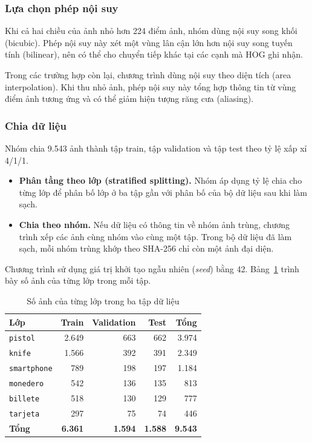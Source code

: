 \subsubsection{Lựa chọn phép nội suy}

Khi cả hai chiều của ảnh nhỏ hơn 224 điểm ảnh, nhóm dùng nội suy song khối (bicubic). Phép nội suy này xét một vùng lân cận lớn hơn nội suy song tuyến tính (bilinear), nên có thể cho chuyển tiếp khác tại các cạnh mà HOG ghi nhận.

Trong các trường hợp còn lại, chương trình dùng nội suy theo diện tích (area interpolation). Khi thu nhỏ ảnh, phép nội suy này tổng hợp thông tin từ vùng điểm ảnh tương ứng và có thể giảm hiện tượng răng cưa (aliasing).

\subsubsection{Chia dữ liệu}

Nhóm chia 9.543 ảnh thành tập train, tập validation và tập test theo tỷ lệ xấp xỉ 4/1/1.

\begin{itemize}
  \item \textbf{Phân tầng theo lớp (stratified splitting).} Nhóm áp dụng tỷ lệ chia cho từng lớp để phân bố lớp ở ba tập gần với phân bố của bộ dữ liệu sau khi làm sạch.
  \item \textbf{Chia theo nhóm.} Nếu dữ liệu có thông tin về nhóm ảnh trùng, chương trình xếp các ảnh cùng nhóm vào cùng một tập. Trong bộ dữ liệu đã làm sạch, mỗi nhóm trùng khớp theo SHA-256 chỉ còn một ảnh đại diện.
\end{itemize}

Chương trình sử dụng giá trị khởi tạo ngẫu nhiên (\emph{seed}) bằng 42. Bảng~\ref{tab:split} trình bày số ảnh của từng lớp trong mỗi tập.

\begin{table}[H]
\centering
\caption{Số ảnh của từng lớp trong ba tập dữ liệu}
\label{tab:split}
\begin{tabular}{@{}lrrrr@{}}
\toprule
\textbf{Lớp} & \textbf{Train} & \textbf{Validation} & \textbf{Test} & \textbf{Tổng} \\
\midrule
\texttt{pistol}     & 2.649 & 663 & 662 & 3.974 \\
\texttt{knife}      & 1.566 & 392 & 391 & 2.349 \\
\texttt{smartphone} &   789 & 198 & 197 & 1.184 \\
\texttt{monedero}   &   542 & 136 & 135 &   813 \\
\texttt{billete}    &   518 & 130 & 129 &   777 \\
\texttt{tarjeta}    &   297 &  75 &  74 &   446 \\
\midrule
\textbf{Tổng}       & \textbf{6.361} & \textbf{1.594} & \textbf{1.588} & \textbf{9.543} \\
\bottomrule
\end{tabular}
\end{table}

